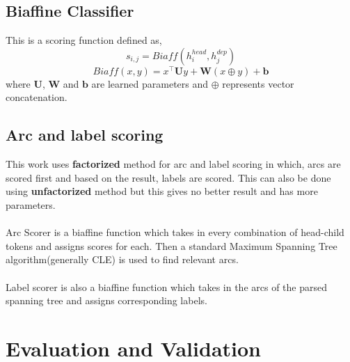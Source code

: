 \subsection{Biaffine Classifier}
This is a scoring function defined as,
$$s_{i,j} = Biaff(h_i^{head}, h_j^{dep})$$
$$Biaff(x, y) = x^\top \textbf{U}y + \textbf{W}(x \oplus y) + \textbf{b}$$
where $\textbf{U}$, $\textbf{W}$ and $\textbf{b}$ are learned parameters and
$\oplus$ represents vector concatenation.

\subsection{Arc and label scoring}
This work uses \textbf{factorized} method for arc and label scoring in which,
arcs are scored first and based on the result, labels are scored. This can also
be done using \textbf{unfactorized} method but this gives no better result and
has more parameters.
\\~\\
Arc Scorer is a biaffine function which takes in every combination of
head-child tokens and assigns scores for each. Then a standard Maximum Spanning
Tree algorithm(generally CLE) is used to find relevant arcs.
\\~\\
Label scorer is also a biaffine function which takes in the arcs of the parsed
spanning tree and assigns corresponding labels.

\section{Evaluation and Validation}
